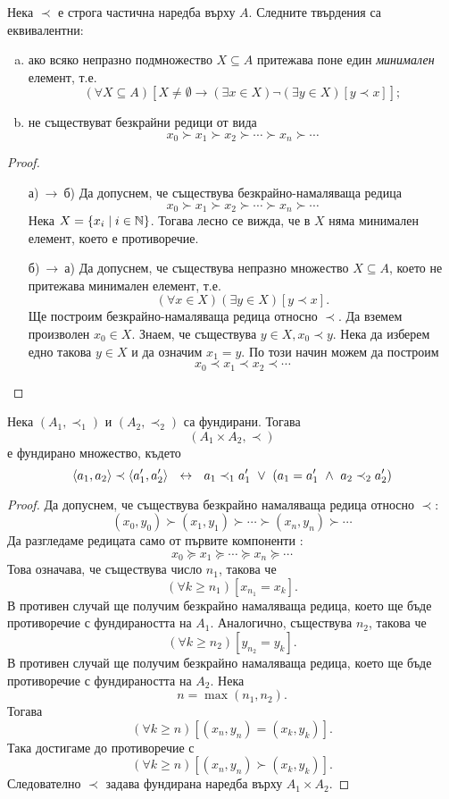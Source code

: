\begin{prop}
  Нека $\prec$ е строга частична наредба върху $A$.
  Следните твърдения са  еквивалентни:
  \begin{enumerate}[a)]
  \item
    ако всяко непразно подмножество $X\subseteq A$ притежава поне един {\em минимален} елемент, т.е.
    \[(\forall X\subseteq A)[X\neq\emptyset \rightarrow (\exists x\in X)\neg(\exists y\in X)[y \prec x]];\]
  \item
    не съществуват безкрайни редици от вида
    \[x_0 \succ x_1 \succ x_2 \succ \cdots \succ x_n \succ \cdots\]
  \end{enumerate}
\end{prop}
\begin{proof}
  \begin{enumerate}
  \item[а)$\ \to\ $б)]
    Да допуснем, че съществува безкрайно-намаляваща редица
    \[x_0 \succ x_1 \succ x_2 \succ \cdots \succ x_n \succ \cdots\]
    Нека $X = \{x_i\mid i \in \mathbb{N}\}$.
    Тогава лесно се вижда, че в $X$ няма минимален елемент, което е противоречие.
  \item[б)$\ \to\ $а)]
    Да допуснем, че съществува непразно множество $X \subseteq A$, което не притежава минимален елемент, т.е.
    \[(\forall x\in X)(\exists y\in X)[y \prec x].\]
    Ще построим безкрайно-намаляваща редица относно $\prec$.
    Да вземем произволен $x_0 \in X$. 
    Знаем, че съществува $y \in X, x_0 \prec y$.
    Нека да изберем едно такова $y\in X$ и да означим $x_1 = y$.
    По този начин можем да построим
    \[x_0 \prec x_1 \prec x_2 \prec \cdots \]
  \end{enumerate}
\end{proof}

\begin{prop}
  Нека $(A_1,\prec_1)$ и $(A_2,\prec_2)$ са фундирани.
  Тогава \[(A_1\times A_2, \prec)\]
  е фундирано множество, където
  \[\pair{a_1,a_2}\prec \pair{a^\prime_1,a^\prime_2}\ \iff\ a_1\prec_1 a^\prime_1\ \vee\ (a_1 = a^\prime_1\ \wedge\ a_2\prec_2 a^\prime_2)\]
\end{prop}
\begin{proof}
  Да допуснем, че съществува
  безкрайно намаляваща редица относно $\prec$:
  \[(x_0,y_0)\succ(x_1,y_1) \succ \cdots \succ (x_n,y_n)\succ\cdots\]
  Да разгледаме редицата само от първите компоненти :
  \[x_0 \succeq x_1 \succeq \cdots \succeq x_n \succeq \cdots\]
  Това означава, че съществува число $n_1$, такова че 
  \[(\forall k \geq n_1)[x_{n_1} = x_k].\]
  В противен случай ще получим безкрайно намаляваща редица, което ще бъде
  противоречие с фундираността на $A_1$.
  Аналогично, съществува $n_2$, такова че
  \[(\forall k \geq n_2)[y_{n_2} = y_k].\]
  В противен случай ще получим безкрайно намаляваща редица, което ще бъде
  противоречие с фундираността на $A_2$.
  Нека \[n = \max(n_1,n_2).\]
  Тогава 
  \[(\forall k\geq n)[(x_n,y_n) = (x_k,y_k)].\]
  Така достигаме до противоречие с 
  \[(\forall k \geq n)[(x_n,y_n) \succ (x_k,y_k)].\]
  Следователно $\prec$ задава фундирана наредба върху $A_1\times A_2$.
\end{proof}



